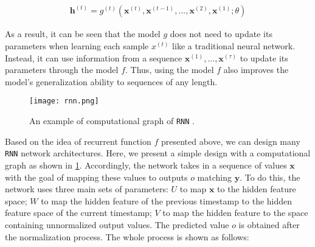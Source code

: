 \begin{align}
    \mathbf{h}^{(t)} = g^{(t)}\left( \mathbf{x}^{(t)}, \mathbf{x}^{(t-1)},\dots,\mathbf{x}^{(2)},\mathbf{x}^{(1)}; \theta \right)
    \label{eq:rnn_g}
\end{align}


As a result, it can be seen that the model $g$ does not need to update its parameters when learning each sample $x^{(t)}$ like a traditional neural network. Instead, it can use information from a sequence $\mathbf{x}^{(1)},\dots,\mathbf{x}^{(\tau)}$ to update its parameters through the model $f$. Thus, using the model $f$ also improves the model's generalization ability to sequences of any length.

\begin{figure}[H]
    \centering
    \texttt{[image: rnn.png]}
    \cprotect\caption{An example of computational graph of \verb|RNN| \cite{goodfellow2016deep}.}
    \label{fig:rnn}
\end{figure}


Based on the idea of recurrent function $f$ presented above, we can design many \verb|RNN| network architectures. Here, we present a simple design with a computational graph as shown in \ref{fig:rnn}. Accordingly, the network takes in a sequence of values $\mathbf{x}$ with the goal of mapping these values to outputs $o$ matching $\mathbf{y}$. To do this, the network uses three main sets of parameters: $U$ to map $\mathbf{x}$ to the hidden feature space; $W$ to map the hidden feature of the previous timestamp to the hidden feature space of the current timestamp; $V$ to map the hidden feature to the space containing unnormalized output values. The predicted value $o$ is obtained after the normalization process. The whole process is shown as follows:

